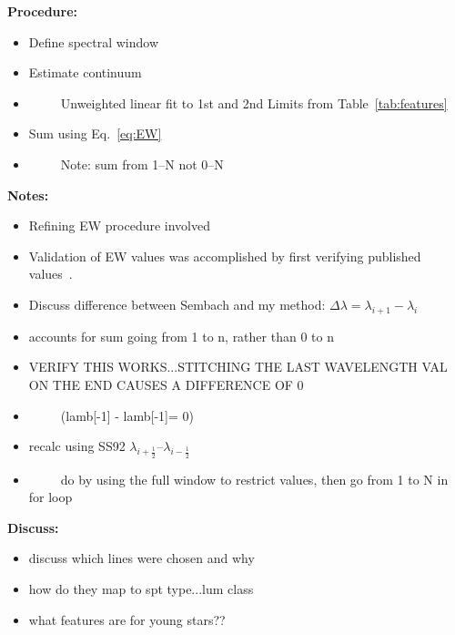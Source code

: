 {\bf Procedure:}\\
\begin{itemize}
	\item{} Define spectral window
	\item{} Estimate continuum
	\item{}~~~~~Unweighted linear fit to 1st and 2nd Limits from Table~\ref{tab:features}
	\item{} Sum using Eq.~\ref{eq:EW}
	\item{}~~~~~Note: sum from 1--N not 0--N
\end{itemize}


{\bf Notes:}\\
\begin{itemize}
	\item{} Refining EW procedure involved
	\item{} Validation of EW values was accomplished by first verifying published values~\cite{Rayner_2009}.
	\item{} Discuss difference between Sembach and my method: $\Delta\lambda = \lambda_{i+1} - \lambda_{i}$
	\item{} accounts for sum going from 1 to n, rather than 0 to n
	\item{} VERIFY THIS WORKS...STITCHING THE LAST WAVELENGTH VAL ON THE END CAUSES A DIFFERENCE OF 0
	\item{}~~~~~(lamb[-1] - lamb[-1]= 0)
	\item{} recalc using SS92 $\lambda_{i+\frac{1}{2}}$--$\lambda_{i-\frac{1}{2}}$
	\item{}~~~~~do by using the full window to restrict values, then go from 1 to N in for loop
\end{itemize}




{\bf Discuss:}\\
\begin{itemize}
	\item{} discuss which lines were chosen and why
	\item{} how do they map to spt type...lum class
	\item{} what features are for young stars??
\end{itemize}


